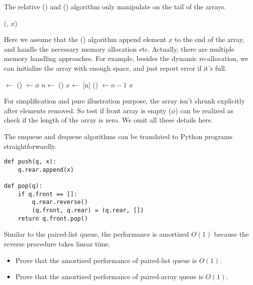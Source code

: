 \documentclass{article}
\begin{document}
The relative () and () algorithm only manipulate
on the tail of the arrays.

\begin{algorithmic}
  \State {}(, $x$)
\EndFunction
\end{algorithmic}

Here we assume that the () algorithm append element $x$ to
the end of the array, and handle the necessary memory allocation etc. Actually,
there are multiple memory handling approaches. For example, besides the
dynamic re-allocation, we can initialize the array with enough space, and just
report error if it's full.

\begin{algorithmic}
    \State {} $\gets$ ()
    \State {} $\gets \phi$
  \EndIf
  \State $n \gets$ ()
  \State $x \gets$ [n]
  \State {}() $\gets n - 1$
  \State \Return $x$
\EndFunction
\end{algorithmic}

For simplification and pure illustration purpose, the array isn't shrunk
explicitly after elements removed. So test if front array is empty ($\phi$)
can be realized as check if the length of the array is zero. We omit all
these details here.

The enqueue and dequeue algorithms can be translated to Python programs
straightforwardly.

\begin{lstlisting}
def push(q, x):
    q.rear.append(x)

def pop(q):
    if q.front == []:
        q.rear.reverse()
        (q.front, q.rear) = (q.rear, [])
    return q.front.pop()
\end{lstlisting}

Similar to the paired-list queue, the performance is amortized $O(1)$
because the reverse procedure takes linear time.

\begin{Exercise}
\begin{itemize}
\item Prove that the amortized performance of paired-list queue is $O(1)$.
\item Prove that the amortized performance of paired-array queue is $O(1)$.
\end{itemize}
\end{Exercise}
\end{document}
